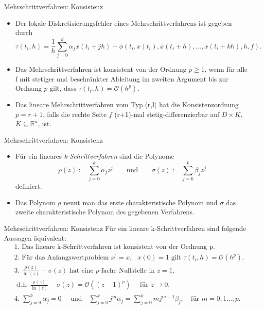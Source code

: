 \begin{frame}{Mehrschrittverfahren: Konsistenz}
    \begin{itemize}
        \item<1-> Der lokale Diskretisierungsfehler eines Mehrschrittverfahrens ist gegeben durch
        \[
            \tau(t_i,h) = \frac{1}{h} \sum_{j=0}^{k} \alpha_j x(t_i + jh) -
            \phi (t_i,x(t_i), x(t_i+h), \dots, x(t_i+kh),h,f).
        \]
        \item<2-> Das Mehrschrittverfahren ist konsistent von der Ordnung $p\geq 1$, wenn für alle f mit
        stetiger und beschränkter Ableitung im zweiten Argument bis zur Ordnung $p$ gilt, dass
        $\tau(t_i,h) = \mathcal{O}(h^p)$.
        \item<3-> Das lineare Mehrschrittverfahren vom Typ (r,l) hat die Konsistenzordnung $p=r+1$, falls die rechte
        Seite $f$ (r+1)-mal stetig-differenzierbar auf $D \times K$, $K\subseteq \mathbb{R}^n$, ist.
    \end{itemize}
\end{frame}

\begin{frame}{Mehrschrittverfahren: Konsistenz}
    \begin{itemize}
        \item<1-> Für ein lineares \textit{k-Schrittverfahren} sind die Polynome
        \[
            \rho(z) := \sum_{j=0}^{k} \alpha_j z^j \qquad \text{und} \qquad \sigma(z) := \sum_{j=0}^{k} \beta_j z^j
        \]
        definiert.
        \item<2-> Das Polynom $\rho$ nennt man das erste charakteristische Polynom und $\sigma$ das zweite charakteristische
        Polynom des gegebenen Verfahrens.
    \end{itemize}
\end{frame}

\begin{frame}{Mehrschrittverfahren: Konsistenz}
    Für ein lineare k-Schrittverfahren sind folgende Aussagen äquivalent:
    \begin{align*}
        &\text{1. Das lineare k-Schrittverfahren ist konsistent von der Ordnung p.}\\
        &\text{2. Für das Anfangswertproblem }
        x^{\prime} = x, \text{ }
        x(0) = 1
        \text{ gilt } \tau(t_i,h) = \mathcal{O}(h^p).\\
        &\text{3. } \frac{\rho(z)}{\ln(z)} - \sigma(z) \text{ hat eine $p$-fache Nullstelle in } z= 1,\\
        &\text{ d.h. }
        \frac{\rho(z)}{\ln(z)} - \sigma(z) = \mathcal{O}((z-1)^p) \quad \text{ für } z \rightarrow 0.\\
        &\text{4. } \sum_{j=0}^{k} \alpha_j = 0 \quad \text{ und} \quad
        \sum_{j=0}^{k} j^m \alpha_j = \sum_{j=0}^{k} mj^{m-1} \beta_j,  \quad \text{für } m=0,1 \dots, p.
    \end{align*}
\end{frame}

